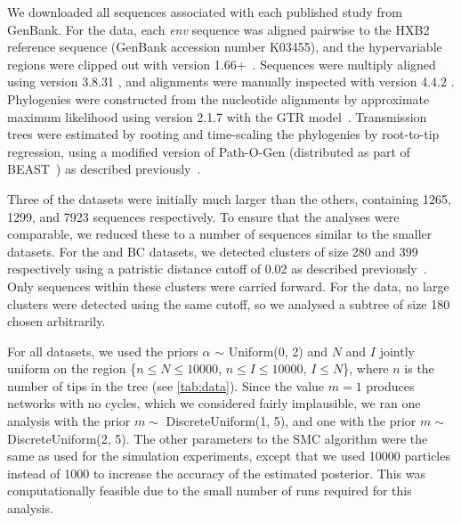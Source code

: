 We downloaded all sequences associated with each published study from GenBank.
For the \textcite{novitsky2014impact} data, each \textit{env} sequence was
aligned pairwise to the HXB2 reference sequence (GenBank accession number
K03455), and the hypervariable regions were clipped out with
 version 1.66+~\autocite{cock2009biopython}. Sequences were
multiply aligned using  version 3.8.31
\autocite{edgar2004muscle}, and alignments were manually inspected with
 version 4.4.2 \autocite{gouy2010seaview}. Phylogenies were
constructed from the nucleotide alignments by approximate maximum likelihood
using  version 2.1.7 \autocite{price2010fasttree} with the
\gls{GTR} model~\autocite{tavare1986some}. Transmission trees were estimated by
rooting and time-scaling the phylogenies by root-to-tip regression, using a
modified version of Path-O-Gen (distributed as part of
BEAST~\autocite{drummond2007beast}) as described
previously~\autocite{poon2015phylodynamic}. 

Three of the datasets \autocite[][and the BC data]{li2015hiv,novitsky2014impact}
were initially much larger than the others, containing 1265, 1299, and 7923
sequences respectively. To ensure that the analyses were comparable, we reduced
these to a number of sequences similar to the smaller datasets. For the
\citeauthor{li2015hiv} and BC datasets, we detected clusters of size 280 and
399 respectively using a patristic distance cutoff of 0.02 as described
previously~\autocite{poon2015impact}. Only sequences within these clusters were
carried forward. For the \textcite{novitsky2014impact} data, no large clusters
were detected using the same cutoff, so we analysed a subtree of size 180
chosen arbitrarily.

For all datasets, we used the priors $\alpha$ $\sim$ Uniform(0, 2) and $N$ and
$I$ jointly uniform on the region \{$n \leq N \leq 10000$, $n \leq I \leq
10000$, $I \leq N$\}, where $n$ is the number of tips in the tree (see
\cref{tab:data}). Since the value $m = 1$ produces networks with no cycles,
which we considered fairly implausible, we ran one analysis with the prior $m
\sim$ DiscreteUniform(1, 5), and one with the prior $m \sim$ DiscreteUniform(2,
5). The other parameters to the SMC algorithm were the same as used for the
simulation experiments, except that we used 10000 particles instead of 1000 to
increase the accuracy of the estimated posterior. This was computationally
feasible due to the small number of runs required for this analysis.

